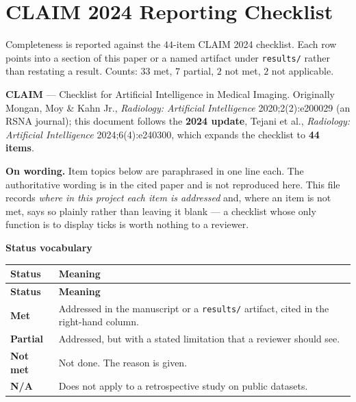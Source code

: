 %
\section{CLAIM 2024 Reporting Checklist}
\label{app:claim}

Completeness is reported against the $44$-item CLAIM 2024 checklist. Each row points into a
section of this paper or a named artifact under \texttt{results/} rather than restating a
result. Counts: $33$ met, $7$ partial, $2$ not met, $2$ not applicable.


\textbf{CLAIM} --- Checklist for Artificial Intelligence in Medical Imaging. Originally Mongan, Moy \& Kahn Jr., \emph{Radiology: Artificial Intelligence} 2020;2(2):e200029 (an RSNA journal); this document follows the \textbf{2024 update}, Tejani et al., \emph{Radiology: Artificial Intelligence} 2024;6(4):e240300, which expands the checklist to \textbf{44 items}.


\textbf{On wording.} Item topics below are paraphrased in one line each. The authoritative wording is in the cited paper and is not reproduced here. This file records \emph{where in this project each item is addressed} and, where an item is not met, says so plainly rather than leaving it blank --- a checklist whose only function is to display ticks is worth nothing to a reviewer.


\textbf{Status vocabulary}


\begin{longtable}{@{}lp{}@{}}
\toprule
\textbf{Status} & \textbf{Meaning} \\
\midrule
\endfirsthead
\toprule
\textbf{Status} & \textbf{Meaning} \\
\midrule
\endhead
\bottomrule
\endfoot
\textbf{Met} & Addressed in the manuscript or a \texttt{results/} artifact, cited in the right-hand column. \\
\textbf{Partial} & Addressed, but with a stated limitation that a reviewer should see. \\
\textbf{Not met} & Not done. The reason is given. \\
\textbf{N/A} & Does not apply to a retrospective study on public datasets. \\
\end{longtable}



